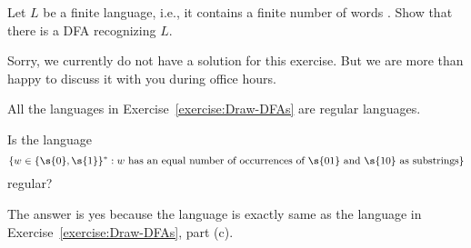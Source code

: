 \begin{flex}
\label{grp:exercise:Finite-languages-are-regular}

\begin{exercise}
\label{exercise:Finite-languages-are-regular}
Let $L$ be a finite language, i.e., it contains a finite number of words . Show that there is a DFA recognizing $L$.

\end{exercise}

\begin{solution}
\label{sol:deterministic-finite-automata::sorry}
Sorry, we currently do not have a solution for this exercise. But we are more than happy to discuss it with you during office hours.

\end{solution}
\end{flex}

\begin{flex}
\label{grp:definition:Regular-language}


\begin{example}
\label{example:Some-examples-of-regular-languages}
All the languages in Exercise~\ref{exercise:Draw-DFAs} are regular languages.

\end{example}
\end{flex}

\begin{flex}
\label{grp:exercise:Equal-number-of-01s-and-10s}

\begin{exercise}
\label{exercise:Equal-number-of-01s-and-10s}
Is the language
\[
    \{w \in \{\s{0},\s{1}\}^* : w \text{ has an equal number of occurrences of $\s{01}$ and $\s{10}$ as substrings}\}
\]
regular?

\end{exercise}

\begin{solution}
\label{sol:deterministic-finite-automata::answer}
The answer is yes because the language is exactly same as the language in Exercise~\ref{exercise:Draw-DFAs}, part (c).

\end{solution}
\end{flex}

